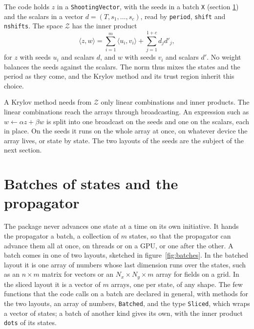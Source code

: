 \documentclass[11pt,a4paper]{article}
\newcommand{\Z}{\mathcal{Z}}
\newcommand{\ip}[2]{\langle #1, #2\rangle}
\newcommand{\code}[1]{\texttt{#1}}
\begin{document}
The code holds $z$ in a \code{ShootingVector}, with the seeds in a batch \code{X} (section
\ref{sec:batches}) and the scalars in a vector $d = (T, s_1, \dots, s_c)$, read by \code{period},
\code{shift} and \code{nshifts}. The space $\Z$ has the inner product
\begin{equation}
  \ip{z}{w} = \sum_{i=1}^m \ip{u_i}{v_i} + \sum_{j=1}^{1+c} d_j d'_j ,
  \label{eq:ipz}
\end{equation}
for $z$ with seeds $u_i$ and scalars $d$, and $w$ with seeds $v_i$ and scalars $d'$. No weight
balances the seeds against the scalars. The norm thus mixes the states and the period as they
come, and the Krylov method and its trust region inherit this choice.

A Krylov method needs from $\Z$ only linear combinations and inner products. The linear
combinations reach the arrays through broadcasting. An expression such as $w \leftarrow \alpha z +
\beta w$ is split into one broadcast on the seeds and one on the scalars, each in place. On the
seeds it runs on the whole array at once, on whatever device the array lives, or state by state.
The two layouts of the seeds are the subject of the next section.

\section{Batches of states and the propagator}
\label{sec:batches}

The package never advances one state at a time on its own initiative. It hands the propagator a
batch, a collection of $m$ states, so that the propagator can advance them all at once, on threads
or on a GPU, or one after the other. A batch comes in one of two layouts, sketched in
figure~\ref{fig:batches}. In the batched layout it is one array of numbers whose last dimension
runs over the states, such as an $n \times m$ matrix for vectors or an $N_x \times N_y \times m$
array for fields on a grid. In the sliced layout it is a vector of $m$ arrays, one per state, of
any shape. The few functions that the code calls on a batch are declared in general, with
methods for the two layouts, an array of numbers, \code{Batched}, and the type \code{Sliced},
which wraps a vector of states; a batch of another kind gives its own, with the inner product
\code{dots} of its states.
\end{document}
